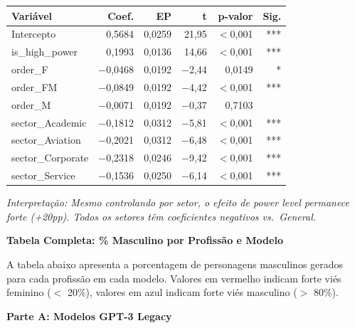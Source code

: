 \documentclass[12pt,a4paper]{article}
\begin{document}
\begin{table}[H]
\centering
\begin{tabular}{lrrrrr}
\toprule
\textbf{Variável} & \textbf{Coef.} & \textbf{EP} & \textbf{t} & \textbf{p-valor} & \textbf{Sig.} \\
\midrule
Intercepto & 0,5684 & 0,0259 & 21,95 & $<$0,001 & *** \\
is\_high\_power & 0,1993 & 0,0136 & 14,66 & $<$0,001 & *** \\
order\_F & $-$0,0468 & 0,0192 & $-$2,44 & 0,0149 & * \\
order\_FM & $-$0,0849 & 0,0192 & $-$4,42 & $<$0,001 & *** \\
order\_M & $-$0,0071 & 0,0192 & $-$0,37 & 0,7103 & \\
sector\_Academic & $-$0,1812 & 0,0312 & $-$5,81 & $<$0,001 & *** \\
sector\_Aviation & $-$0,2021 & 0,0312 & $-$6,48 & $<$0,001 & *** \\
sector\_Corporate & $-$0,2318 & 0,0246 & $-$9,42 & $<$0,001 & *** \\
sector\_Service & $-$0,1536 & 0,0250 & $-$6,14 & $<$0,001 & *** \\
\bottomrule
\end{tabular}
\end{table}

\noindent\textit{Interpretação: Mesmo controlando por setor, o efeito de power level
permanece forte (+20pp). Todos os setores têm coeficientes negativos vs.\
General.}

\vspace{0.5cm}
\noindent\textbf{Tabela Completa: \% Masculino por Profissão e Modelo}

A tabela abaixo apresenta a porcentagem de personagens masculinos
gerados para cada profissão em cada modelo. Valores em vermelho indicam
forte viés feminino ($<$ 20\%), valores em azul indicam forte viés
masculino ($>$ 80\%).

\vspace{0.5cm}
\noindent\textbf{Parte A: Modelos GPT-3 Legacy}
\end{document}
